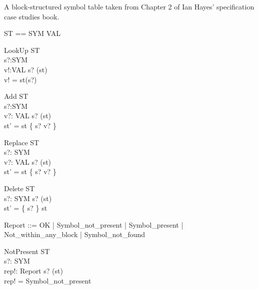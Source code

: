 A block-structured symbol table taken from Chapter 2
of Ian Hayes' specification case studies book.

\begin{zed}
ST == SYM \pfun VAL
\end{zed}

\begin{schema}{LookUp}
  \Xi ST \\
  s?:SYM \\
  v!:VAL
\where
  s? \in \dom(st) \\
  v! = st(s?)
\end{schema}

\begin{schema}{Add}
  \Delta ST \\
  s?:SYM \\
  v?: VAL
\where
  s? \notin \dom(st) \\
  st' = st \cup \{ s? \mapsto v? \}
\end{schema}

\begin{schema}{Replace}
  \Delta ST \\
  s?: SYM \\
  v?: VAL
\where
  s? \in \dom(st) \\
  st' = st \oplus \{ s? \mapsto v? \}
\end{schema}

\begin{schema}{Delete}
  \Delta ST \\
  s?: SYM
\where
  s? \in \dom(st) \\
  st' = \{ s? \} \ndres st
\end{schema}


\begin{zed}
  Report ::= OK
                  | Symbol\_not\_present
		  | Symbol\_present
		  | Not\_within\_any\_block
		  | Symbol\_not\_found
\end{zed}

\begin{schema}{NotPresent}
  \Xi ST \\
  s?: SYM \\
  rep!: Report
\where
  s? \notin \dom(st) \\
  rep! = Symbol\_not\_present
\end{schema}

